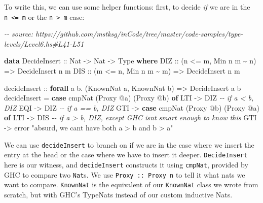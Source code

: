 \documentclass[]{article}
\newenvironment{Shaded}{}{}
\newcommand{\CommentTok}[1]{\textcolor[rgb]{0.38,0.63,0.69}{\textit{#1}}}
\newcommand{\DataTypeTok}[1]{\textcolor[rgb]{0.56,0.13,0.00}{#1}}
\newcommand{\FunctionTok}[1]{\textcolor[rgb]{0.02,0.16,0.49}{#1}}
\newcommand{\KeywordTok}[1]{\textcolor[rgb]{0.00,0.44,0.13}{\textbf{#1}}}
\newcommand{\NormalTok}[1]{#1}
\newcommand{\OperatorTok}[1]{\textcolor[rgb]{0.40,0.40,0.40}{#1}}
\newcommand{\OtherTok}[1]{\textcolor[rgb]{0.00,0.44,0.13}{#1}}
\newcommand{\StringTok}[1]{\textcolor[rgb]{0.25,0.44,0.63}{#1}}
\begin{document}
To write this, we can use some helper functions: first, to decide \emph{if} we
are in the \texttt{n\ \textless{}=\ m} or the \texttt{n\ \textgreater{}\ m}
case:

\begin{Shaded}
\begin{Highlighting}[]
\CommentTok{{-}{-} source: https://github.com/mstksg/inCode/tree/master/code{-}samples/type{-}levels/Level6.hs\#L41{-}L51}

\KeywordTok{data} \DataTypeTok{DecideInsert}\OtherTok{ ::} \DataTypeTok{Nat} \OtherTok{{-}\textgreater{}} \DataTypeTok{Nat} \OtherTok{{-}\textgreater{}} \DataTypeTok{Type} \KeywordTok{where}
  \DataTypeTok{DIZ}\OtherTok{ ::}\NormalTok{ (n }\OperatorTok{\textless{}=}\NormalTok{ m, }\DataTypeTok{Min}\NormalTok{ n m }\OperatorTok{\textasciitilde{}}\NormalTok{ n) }\OtherTok{=\textgreater{}} \DataTypeTok{DecideInsert}\NormalTok{ n m}
  \DataTypeTok{DIS}\OtherTok{ ::}\NormalTok{ (m }\OperatorTok{\textless{}=}\NormalTok{ n, }\DataTypeTok{Min}\NormalTok{ n m }\OperatorTok{\textasciitilde{}}\NormalTok{ m) }\OtherTok{=\textgreater{}} \DataTypeTok{DecideInsert}\NormalTok{ n m}

\OtherTok{decideInsert ::} \KeywordTok{forall}\NormalTok{ a b}\OperatorTok{.}\NormalTok{ (}\DataTypeTok{KnownNat}\NormalTok{ a, }\DataTypeTok{KnownNat}\NormalTok{ b) }\OtherTok{=\textgreater{}} \DataTypeTok{DecideInsert}\NormalTok{ a b}
\NormalTok{decideInsert }\OtherTok{=} \KeywordTok{case}\NormalTok{ cmpNat (}\DataTypeTok{Proxy} \OperatorTok{@}\NormalTok{a) (}\DataTypeTok{Proxy} \OperatorTok{@}\NormalTok{b) }\KeywordTok{of}
  \DataTypeTok{LTI} \OtherTok{{-}\textgreater{}} \DataTypeTok{DIZ} \CommentTok{{-}{-} if a \textless{} b, DIZ}
  \DataTypeTok{EQI} \OtherTok{{-}\textgreater{}} \DataTypeTok{DIZ} \CommentTok{{-}{-} if a == b, DIZ}
  \DataTypeTok{GTI} \OtherTok{{-}\textgreater{}} \KeywordTok{case}\NormalTok{ cmpNat (}\DataTypeTok{Proxy} \OperatorTok{@}\NormalTok{b) (}\DataTypeTok{Proxy} \OperatorTok{@}\NormalTok{a) }\KeywordTok{of}
    \DataTypeTok{LTI} \OtherTok{{-}\textgreater{}} \DataTypeTok{DIS} \CommentTok{{-}{-} if a \textgreater{} b, DIZ, except GHC isn\textquotesingle{}t smart enough to know this}
    \DataTypeTok{GTI} \OtherTok{{-}\textgreater{}} \FunctionTok{error} \StringTok{"absurd, we can\textquotesingle{}t have both a \textgreater{} b and b \textgreater{} a"}
\end{Highlighting}
\end{Shaded}

We can use \texttt{decideInsert} to branch on if we are in the case where we
insert the entry at the head or the case where we have to insert it deeper.
\texttt{DecideInsert} here is our witness, and \texttt{decideInsert} constructs
it using \texttt{cmpNat}, provided by GHC to compare two \texttt{Nat}s. We use
\texttt{Proxy\ ::\ Proxy\ n} to tell it what nats we want to compare.
\texttt{KnownNat} is the equivalent of our \texttt{KnownNat} class we wrote from
scratch, but with GHC's TypeNats instead of our custom inductive Nats.
\end{document}
